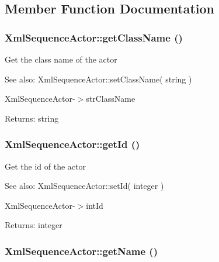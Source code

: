 \subsection{Member Function Documentation}
\hypertarget{class_xml_sequence_actor_a0e9b0bda1ded8557d7ea610dddb7fed}{
\subsubsection[{getClassName}]{\setlength{\rightskip}{0pt plus 5cm}XmlSequenceActor::getClassName ()}}
\label{class_xml_sequence_actor_a0e9b0bda1ded8557d7ea610dddb7fed}


Get the class name of the actor

\begin{Desc}
\item[See also:]XmlSequenceActor::setClassName( string ) 

XmlSequenceActor-$>$strClassName \end{Desc}
\begin{Desc}
\item[Returns:]string \end{Desc}
\hypertarget{class_xml_sequence_actor_47f896a3346344e6eae51239fa53e813}{
\subsubsection[{getId}]{\setlength{\rightskip}{0pt plus 5cm}XmlSequenceActor::getId ()}}
\label{class_xml_sequence_actor_47f896a3346344e6eae51239fa53e813}


Get the id of the actor

\begin{Desc}
\item[See also:]XmlSequenceActor::setId( integer ) 

XmlSequenceActor-$>$intId \end{Desc}
\begin{Desc}
\item[Returns:]integer \end{Desc}
\hypertarget{class_xml_sequence_actor_9a15dbaba511bef833d66240f927a04b}{
\subsubsection[{getName}]{\setlength{\rightskip}{0pt plus 5cm}XmlSequenceActor::getName ()}}
\label{class_xml_sequence_actor_9a15dbaba511bef833d66240f927a04b}


